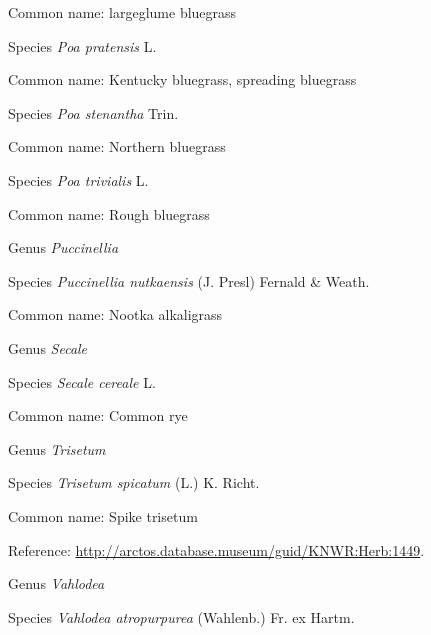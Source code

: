 \documentclass[9pt, article]{memoir}
\begin{document}
\begin{multicols}{2}
Common name: largeglume bluegrass

\vspace{6pt}\noindent\hspace{36pt}Species \textit{Poa pratensis} L.


Common name: Kentucky bluegrass, spreading bluegrass

\vspace{6pt}\noindent\hspace{36pt}Species \textit{Poa stenantha} Trin.


Common name: Northern bluegrass

\vspace{6pt}\noindent\hspace{36pt}Species \textit{Poa trivialis} L.


Common name: Rough bluegrass

\vspace{6pt}\noindent\hspace{30pt}Genus \textit{Puccinellia}


\vspace{6pt}\noindent\hspace{36pt}Species \textit{Puccinellia nutkaensis} (J. Presl) Fernald \& Weath.


Common name: Nootka alkaligrass

\vspace{6pt}\noindent\hspace{30pt}Genus \textit{Secale}


\vspace{6pt}\noindent\hspace{36pt}Species \textit{Secale cereale} L.


Common name: Common rye

\vspace{6pt}\noindent\hspace{30pt}Genus \textit{Trisetum}


\vspace{6pt}\noindent\hspace{36pt}Species \textit{Trisetum spicatum} (L.) K. Richt.


Common name: Spike trisetum

Reference: 
\url{http://arctos.database.museum/guid/KNWR:Herb:1449}.

\vspace{6pt}\noindent\hspace{30pt}Genus \textit{Vahlodea}


\vspace{6pt}\noindent\hspace{36pt}Species \textit{Vahlodea atropurpurea} (Wahlenb.) Fr. ex Hartm.



\end{multicols}
\end{document}
